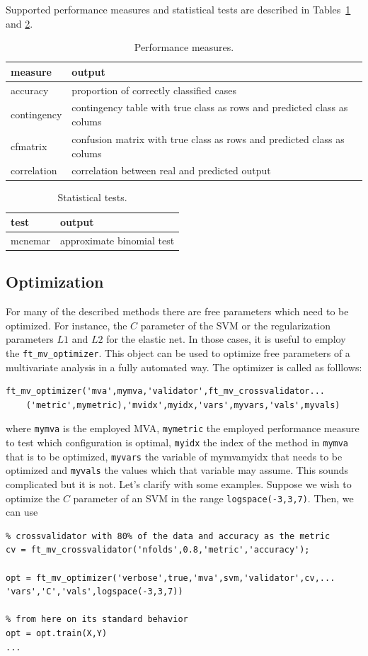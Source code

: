 \documentclass{article}
\renewcommand{\t}[1]{{\tt #1}}
\begin{document}
Supported performance measures and statistical tests are described in Tables~\ref{measure} and \ref{test}.
\begin{table}[ht]
\centering
\caption{Performance measures.}
\begin{tabular}{p{}|p{}}
{\bf measure} & {\bf output}\\
\hline
accuracy &proportion of correctly classified cases\\
contingency & contingency table with true class as rows and predicted class as colums\\
cfmatrix & confusion matrix with true class as rows and predicted class as colums\\
correlation & correlation between real and predicted output
\end{tabular}
\label{measure}
\end{table}

\begin{table}[ht]
\centering
\caption{Statistical tests.}
\begin{tabular}{p{}|p{}}
{\bf test} & {\bf output}\\
\hline
mcnemar & approximate binomial test
\end{tabular}
\label{test}
\end{table}


\subsection{Optimization}

For many of the described methods there are free parameters which need to be optimized. For instance, the $C$ parameter of the SVM or  the regularization parameters $L1$ and $L2$ for the elastic net.  In those cases, it is useful to employ the \t{ft\_mv\_optimizer}.  This object can be used to optimize free parameters of a multivariate analysis in a fully automated way. The optimizer is called as folllows:
\begin{verbatim}
ft_mv_optimizer('mva',mymva,'validator',ft_mv_crossvalidator...
	('metric',mymetric),'mvidx',myidx,'vars',myvars,'vals',myvals)
\end{verbatim}
where \t{mymva} is the employed MVA, \t{mymetric} the employed performance measure to test which configuration is optimal, \t{myidx} the index of the method in \t{mymva} that is to be optimized, \t{myvars} the variable of mymva{myidx} that needs to be optimized and \t{myvals} the values which that variable may assume. This sounds complicated but it is not. Let's clarify with some examples. Suppose we wish to optimize the $C$ parameter of an SVM in the range \t{logspace(-3,3,7)}. Then, we can use 
\begin{verbatim}
% crossvalidator with 80% of the data and accuracy as the metric
cv = ft_mv_crossvalidator('nfolds',0.8,'metric','accuracy'); 

opt = ft_mv_optimizer('verbose',true,'mva',svm,'validator',cv,...
'vars','C','vals',logspace(-3,3,7))

% from here on its standard behavior
opt = opt.train(X,Y) 
...
\end{verbatim}
\end{document}
